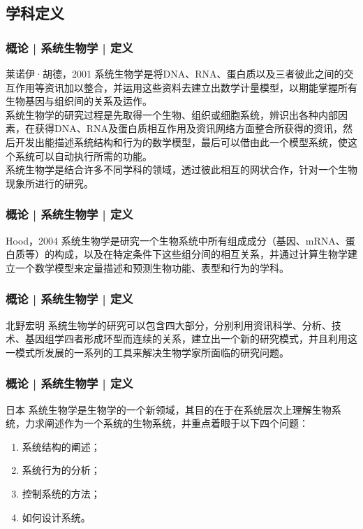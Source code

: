 \subsection{学科定义}
\begin{frame}
  \frametitle{概论 | 系统生物学 | 定义}
  \begin{block}{莱诺伊·胡德，2001}
系统生物学是将DNA、RNA、蛋白质以及三者彼此之间的交互作用等资讯加以整合，并运用这些资料去建立出数学计量模型，以期能掌握所有生物基因与组织间的关系及运作。\\
\vspace{1em}
系统生物学的研究过程是先取得一个生物、组织或细胞系统，辨识出各种内部因素，在获得DNA、RNA及蛋白质相互作用及资讯网络方面整合所获得的资讯，然后开发出能描述系统结构和行为的数学模型，最后可以借由此一个模型系统，使这个系统可以自动执行所需的功能。\\
\vspace{1em}
系统生物学是结合许多不同学科的领域，透过彼此相互的网状合作，针对一个生物现象所进行的研究。
  \end{block}
\end{frame}

\begin{frame}
  \frametitle{概论 | 系统生物学 | 定义}
  \begin{block}{Hood，2004}
系统生物学是研究一个生物系统中所有组成成分（基因、mRNA、蛋白质等）的构成，以及在特定条件下这些组分间的相互关系，并通过计算生物学建立一个数学模型来定量描述和预测生物功能、表型和行为的学科。
  \end{block}
\end{frame}

\begin{frame}
  \frametitle{概论 | 系统生物学 | 定义}
  \begin{block}{北野宏明}
系统生物学的研究可以包含四大部分，分别利用资讯科学、分析、技术、基因组学四者形成环型而连续的关系，建立出一个新的研究模式，并且利用这一模式所发展的一系列的工具来解决生物学家所面临的研究问题。
  \end{block}
\end{frame}

\begin{frame}
  \frametitle{概论 | 系统生物学 | 定义}
  \begin{block}{日本}
系统生物学是生物学的一个新领域，其目的在于在系统层次上理解生物系统，力求阐述作为一个系统的生物系统，并重点着眼于以下四个问题：
  \begin{enumerate}
    \item 系统结构的阐述；
    \item 系统行为的分析；
    \item 控制系统的方法；
    \item 如何设计系统。
  \end{enumerate}
  \end{block}
\end{frame}

